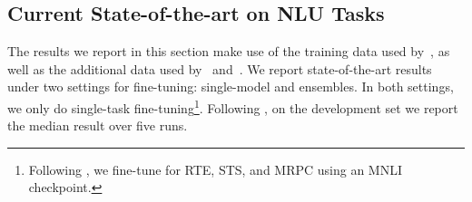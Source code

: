 \vspace{-5pt}

\subsection{Current State-of-the-art on NLU Tasks}

The results we report in this section make use of the training data used by~\cite{devlin2018bert}, as well as the additional data used by~\cite{liu2019roberta} and~\cite{yang2019xlnet}. 
We report state-of-the-art results under two settings for fine-tuning: single-model and ensembles.
In both settings, we only do single-task fine-tuning\footnote{Following \cite{liu2019roberta}, we fine-tune for RTE, STS, and MRPC using an MNLI checkpoint.}.
Following \cite{liu2019roberta}, on the development set we report the median result over five runs.



